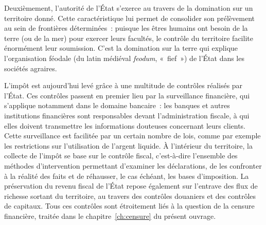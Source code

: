 Deuxièmement, l'autorité de l'État s'exerce au travers de la domination sur un territoire donné. Cette caractéristique lui permet de consolider son prélèvement au sein de frontières déterminées~: puisque les êtres humains ont besoin de la terre (ou de la mer) pour exercer leurs facultés, le contrôle du territoire facilite énormément leur soumission. C'est la domination sur la terre qui explique l'organisation féodale (du latin médiéval \emph{feodum}, «~fief~») de l'État dans les sociétés agraires. %

L'impôt est aujourd'hui levé grâce à une multitude de contrôles réalisés par l'État. Ces contrôles passent en premier lieu par la surveillance financière, qui s'applique notamment dans le domaine bancaire~: les banques et autres institutions financières sont responsables devant l'administration fiscale, à qui elles doivent transmettre les informations douteuses concernant leurs clients. Cette surveillance est facilitée par un certain nombre de lois, comme par exemple les restrictions sur l'utilisation de l'argent liquide. À l'intérieur du territoire, la collecte de l'impôt se base sur le contrôle fiscal, c'est-à-dire l'ensemble des méthodes d'intervention permettant d'examiner les déclarations, de les confronter à la réalité des faits et de réhausser, le cas échéant, les bases d'imposition. La préservation du revenu fiscal de l'État repose également sur l'entrave des flux de richesse sortant du territoire, au travers des contrôles douaniers et des contrôles de capitaux. Tous ces contrôles sont étroitement liés à la question de la censure financière, traitée dans le chapitre~\ref{ch:censure} du présent ouvrage. %

